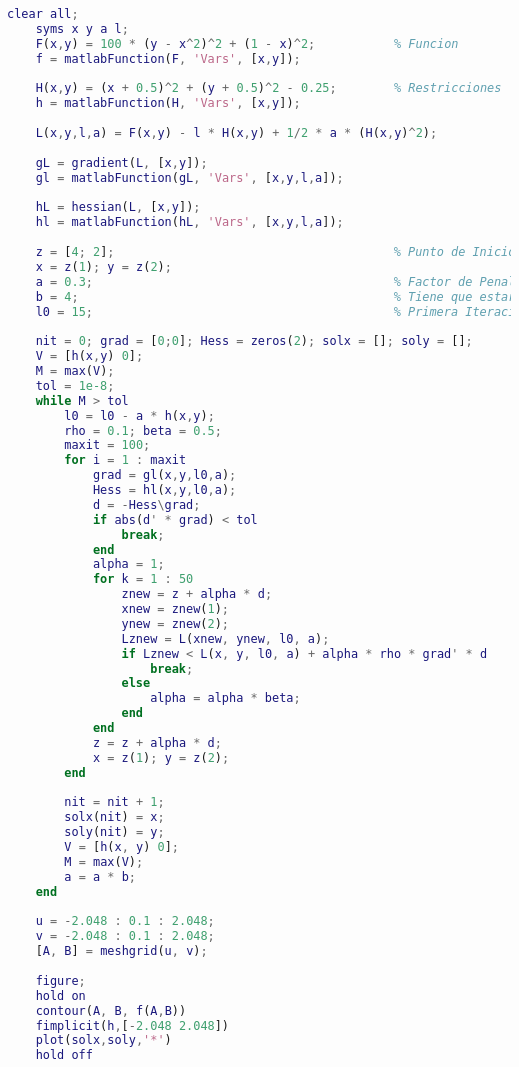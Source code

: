 \begin{lstlisting}[caption={Método del Lagrangiano Aumentado}, language = Matlab]
    clear all;
    syms x y a l;
    F(x,y) = 100 * (y - x^2)^2 + (1 - x)^2;           % Funcion
    f = matlabFunction(F, 'Vars', [x,y]);
    
    H(x,y) = (x + 0.5)^2 + (y + 0.5)^2 - 0.25;        % Restricciones
    h = matlabFunction(H, 'Vars', [x,y]);
    
    L(x,y,l,a) = F(x,y) - l * H(x,y) + 1/2 * a * (H(x,y)^2);             % Lagrangiano aumentado
    
    gL = gradient(L, [x,y]);
    gl = matlabFunction(gL, 'Vars', [x,y,l,a]);
    
    hL = hessian(L, [x,y]);
    hl = matlabFunction(hL, 'Vars', [x,y,l,a]);
    
    z = [4; 2];                                       % Punto de Inicio
    x = z(1); y = z(2);
    a = 0.3;                                          % Factor de Penalizacion Inicial NO MUY GRANDE
    b = 4;                                            % Tiene que estar entre 4 y 10
    l0 = 15;                                          % Primera Iteracion Multiplicador de Lagrange
    
    nit = 0; grad = [0;0]; Hess = zeros(2); solx = []; soly = [];
    V = [h(x,y) 0];
    M = max(V);
    tol = 1e-8;
    while M > tol
        l0 = l0 - a * h(x,y);
        rho = 0.1; beta = 0.5;
        maxit = 100;
        for i = 1 : maxit
            grad = gl(x,y,l0,a);
            Hess = hl(x,y,l0,a);
            d = -Hess\grad;
            if abs(d' * grad) < tol
                break;
            end
            alpha = 1; 
            for k = 1 : 50   
                znew = z + alpha * d;
                xnew = znew(1);
                ynew = znew(2);
                Lznew = L(xnew, ynew, l0, a);
                if Lznew < L(x, y, l0, a) + alpha * rho * grad' * d
                    break;
                else 
                    alpha = alpha * beta;
                end
            end
            z = z + alpha * d;
            x = z(1); y = z(2);
        end
    
        nit = nit + 1;
        solx(nit) = x;
        soly(nit) = y;
        V = [h(x, y) 0];
        M = max(V);
        a = a * b;
    end
    
    u = -2.048 : 0.1 : 2.048; 
    v = -2.048 : 0.1 : 2.048;
    [A, B] = meshgrid(u, v);
    
    figure;
    hold on
    contour(A, B, f(A,B))
    fimplicit(h,[-2.048 2.048])
    plot(solx,soly,'*')
    hold off
\end{lstlisting}

